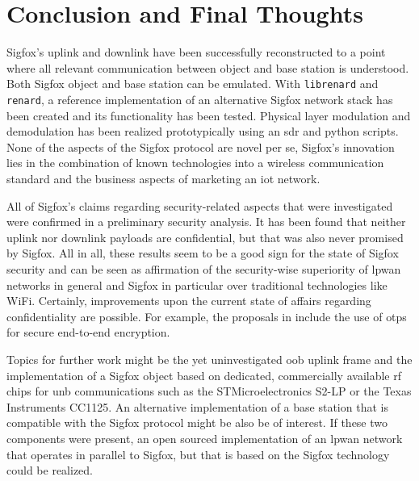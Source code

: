 \chapter{Conclusion and Final Thoughts}
\label{sec:conclusion}
Sigfox's uplink and downlink have been successfully reconstructed to a point where all relevant communication between object and base station is understood.
Both Sigfox object and base station can be emulated.
With \texttt{librenard} and \texttt{renard}, a reference implementation of an alternative Sigfox network stack has been created and its functionality has been tested.
Physical layer modulation and demodulation has been realized prototypically using an \gls{sdr} and python scripts.
None of the aspects of the Sigfox protocol are novel per se, Sigfox's innovation lies in the combination of known technologies into a wireless communication standard and the business aspects of marketing an \gls{iot} network.

All of Sigfox's claims regarding security-related aspects that were investigated were confirmed in a preliminary security analysis.
It has been found that neither uplink nor downlink payloads are confidential, but that was also never promised by Sigfox.
All in all, these results seem to be a good sign for the state of Sigfox security and can be seen as affirmation of the security-wise superiority of \gls{lpwan} networks in general and Sigfox in particular over traditional technologies like WiFi.
Certainly, improvements upon the current state of affairs regarding confidentiality are possible.
For example, the proposals in \cite{otpsecurity} include the use of \glspl{otp} for secure end-to-end encryption.

Topics for further work might be the yet uninvestigated \gls{oob} uplink frame and the implementation of a Sigfox object based on dedicated, commercially available \gls{rf} chips for \gls{unb} communications such as the STMicroelectronics S2-LP or the Texas Instruments CC1125.
An alternative implementation of a base station that is compatible with the Sigfox protocol might be also be of interest.
If these two components were present, an open sourced implementation of an \gls{lpwan} network that operates in parallel to Sigfox, but that is based on the Sigfox technology could be realized.
